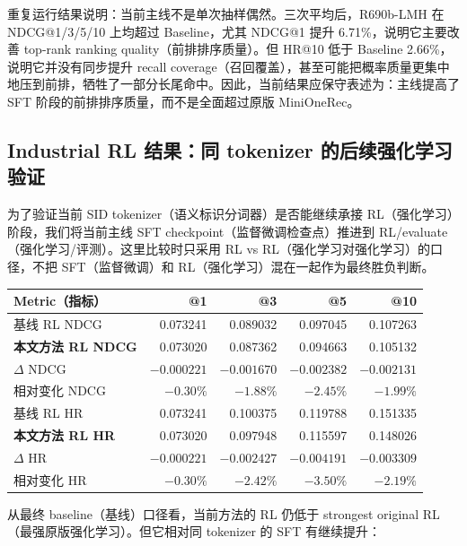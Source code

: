 \documentclass[11pt]{article}
\begin{document}
重复运行结果说明：当前主线不是单次抽样偶然。三次平均后，R690b-LMH 在 NDCG@1/3/5/10 上均超过 Baseline，尤其 NDCG@1 提升 6.71\%，说明它主要改善 top-rank ranking quality（前排排序质量）。但 HR@10 低于 Baseline 2.66\%，说明它并没有同步提升 recall coverage（召回覆盖），甚至可能把概率质量更集中地压到前排，牺牲了一部分长尾命中。因此，当前结果应保守表述为：主线提高了 SFT 阶段的前排排序质量，而不是全面超过原版 MiniOneRec。

\subsection{Industrial RL 结果：同 tokenizer 的后续强化学习验证}

为了验证当前 SID tokenizer（语义标识分词器）是否能继续承接 RL（强化学习）阶段，我们将当前主线 SFT checkpoint（监督微调检查点）推进到 RL/evaluate（强化学习/评测）。这里比较时只采用 RL vs RL（强化学习对强化学习）的口径，不把 SFT（监督微调）和 RL（强化学习）混在一起作为最终胜负判断。

\begin{center}
\begin{tabular}{lrrrr}
\toprule
Metric（指标） & @1 & @3 & @5 & @10 \\
\midrule
基线 RL NDCG & 0.073241 & 0.089032 & 0.097045 & 0.107263 \\
\textbf{本文方法 RL NDCG} & 0.073020 & 0.087362 & 0.094663 & 0.105132 \\
$\Delta$ NDCG & $-0.000221$ & $-0.001670$ & $-0.002382$ & $-0.002131$ \\
相对变化 NDCG & $-0.30\%$ & $-1.88\%$ & $-2.45\%$ & $-1.99\%$ \\
\midrule
基线 RL HR & 0.073241 & 0.100375 & 0.119788 & 0.151335 \\
\textbf{本文方法 RL HR} & 0.073020 & 0.097948 & 0.115597 & 0.148026 \\
$\Delta$ HR & $-0.000221$ & $-0.002427$ & $-0.004191$ & $-0.003309$ \\
相对变化 HR & $-0.30\%$ & $-2.42\%$ & $-3.50\%$ & $-2.19\%$ \\
\bottomrule
\end{tabular}
\end{center}

从最终 baseline（基线）口径看，当前方法的 RL 仍低于 strongest original RL（最强原版强化学习）。但它相对同 tokenizer 的 SFT 有继续提升：
\end{document}
